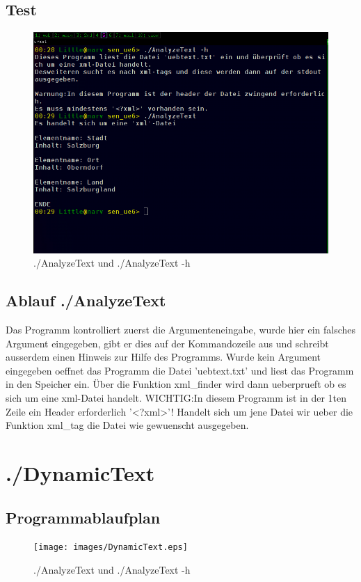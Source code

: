 \documentclass{scrartcl}
\begin{document}
\subsection{Test}
\begin{figure}[H]
  \centering
  \includegraphics[width=0.9\linewidth]{images/Test_AnalyzeText.png}
  \caption{./AnalyzeText und ./AnalyzeText -h}
  \label{fig:digraph}
\end{figure}
\subsection{Ablauf ./AnalyzeText}
Das Programm kontrolliert zuerst die Argumenteneingabe, wurde hier ein falsches Argument eingegeben, gibt er dies auf der Kommandozeile aus und schreibt ausserdem einen Hinweis zur Hilfe des Programms.
Wurde kein Argument eingegeben oeffnet das Programm die Datei 'uebtext.txt' und liest das Programm in den Speicher ein. Über die Funktion xml\_finder wird dann ueberprueft ob es sich um eine xml-Datei handelt.
WICHTIG:In diesem Programm ist in der 1ten Zeile ein Header erforderlich '<?xml>'!
Handelt sich um jene Datei wir ueber die Funktion xml\_tag die Datei wie gewuenscht ausgegeben.
\section{./DynamicText}
\subsection{Programmablaufplan}
\begin{figure}[H]
  \centering
  \texttt{[image: images/DynamicText.eps]}
  \caption{./AnalyzeText und ./AnalyzeText -h}
  \label{fig:digraph}
\end{figure}
\end{document}
